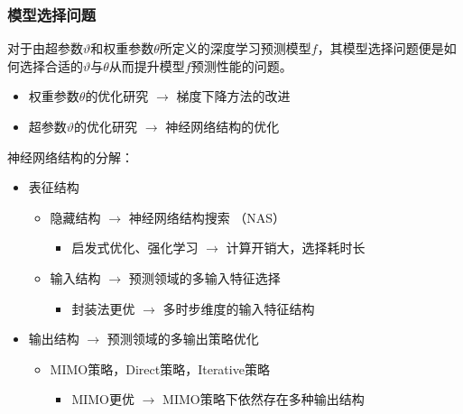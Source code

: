 \begin{frame}
    \frametitle{模型选择问题}

    对于由超参数\(\vartheta\)和权重参数\(\theta\)所定义的深度学习预测模型\(f\)，其模型选择问题便是如何选择合适的\(\vartheta\)与\(\theta\)从而提升模型\(f\)预测性能的问题。

    \begin{itemize}
        \item 权重参数\(\theta\)的优化研究 \(\rightarrow\) 梯度下降方法的改进
        \item 超参数\(\vartheta\)的优化研究 \(\rightarrow\) 神经网络结构的优化
    \end{itemize}

    \vspace{0.5em}
    神经网络结构的分解：
    \begin{itemize}
        \item 表征结构
        \begin{itemize}
            \item 隐藏结构 \(\rightarrow\) 神经网络结构搜索 （NAS）
                \begin{itemize}
                    \item 启发式优化、强化学习 \(\rightarrow\) 计算开销大，选择耗时长
                \end{itemize}
            \item 输入结构 \(\rightarrow\) 预测领域的多输入特征选择
            \begin{itemize}
                \item 封装法更优 \(\rightarrow\) 多时步维度的输入特征结构
            \end{itemize}
        \end{itemize}
        \item 输出结构 \(\rightarrow\) 预测领域的多输出策略优化
 \begin{itemize}
            \item MIMO策略，Direct策略，Iterative策略
            \begin{itemize}
                \item MIMO更优 \(\rightarrow\) MIMO策略下依然存在多种输出结构
            \end{itemize}
        \end{itemize}
    \end{itemize}

\end{frame}

